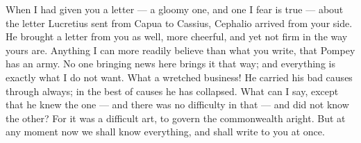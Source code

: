 

 When I had given you a letter --- a gloomy one, and one I fear is true --- about the letter Lucretius sent from Capua to Cassius, Cephalio arrived from your side. He brought a letter from you as well, more cheerful, and yet not firm in the way yours are. Anything I can more readily believe than what you write, that Pompey has an army. No one bringing news here brings it that way; and everything is exactly what I do not want. What a wretched business! He carried his bad causes through always; in the best of causes he has collapsed. What can I say, except that he knew the one --- and there was no difficulty in that --- and did not know the other? For it was a difficult art, to govern the commonwealth aright. But at any moment now we shall know everything, and shall write to you at once.
